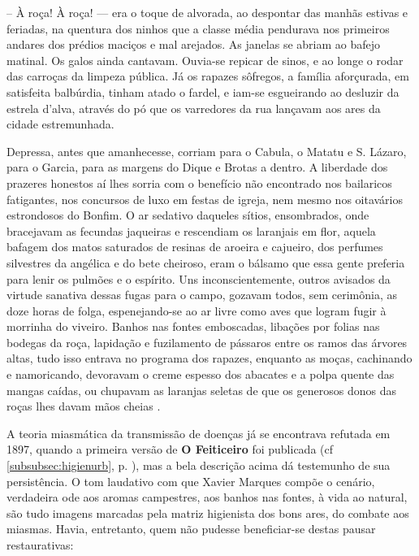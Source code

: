 \begin{citacao}
-- À roça! À roça! --- era o toque de alvorada, ao despontar das manhãs estivas e feriadas, na quentura dos ninhos que a classe média pendurava nos primeiros andares dos prédios maciços e mal arejados. As janelas se abriam ao bafejo matinal. Os galos ainda cantavam. Ouvia-se repicar de sinos, e ao longe o rodar das carroças da limpeza pública. Já os rapazes sôfregos, a família aforçurada, em satisfeita balbúrdia, tinham atado o fardel, e iam-se esgueirando ao desluzir da estrela d'alva, através do pó que os varredores da rua lançavam aos ares da cidade estremunhada.

Depressa, antes que amanhecesse, corriam para o Cabula, o Matatu e S. Lázaro, para o Garcia, para as margens do Dique e Brotas a dentro. A liberdade dos prazeres honestos aí lhes sorria com o benefício não encontrado nos bailaricos fatigantes, nos concursos de luxo em festas de igreja, nem mesmo nos oitavários estrondosos do Bonfim. O ar sedativo daqueles sítios, ensombrados, onde bracejavam as fecundas jaqueiras e rescendiam os laranjais em flor, aquela bafagem dos matos saturados de resinas de aroeira e cajueiro, dos perfumes silvestres da angélica e do bete cheiroso, eram o bálsamo que essa gente preferia para lenir os pulmões e o espírito. Uns inconscientemente, outros avisados da virtude sanativa dessas fugas para o campo, gozavam todos, sem cerimônia, as doze horas de folga, espenejando-se ao ar livre como aves que logram fugir à morrinha do viveiro. Banhos nas fontes emboscadas, libações por folias nas bodegas da roça, lapidação e fuzilamento de pássaros entre os ramos das árvores altas, tudo isso entrava no programa dos rapazes, enquanto as moças, cachinando e namoricando, devoravam o creme espesso dos abacates e a polpa quente das mangas caídas, ou chupavam as laranjas seletas de que os generosos donos das roças lhes davam mãos cheias \cite[pp.~3-4]{marques_feiticeiro_1975}.
\end{citacao}

A teoria miasmática da transmissão de doenças já se encontrava refutada em 1897, quando a primeira versão de \textbf{O Feiticeiro} foi publicada (cf \autoref{subsubsec:higienurb}, p. \pageref{subsubsec:higienurb}), mas a bela descrição acima dá testemunho de sua persistência. O tom laudativo com que Xavier Marques compõe o cenário, verdadeira ode aos aromas campestres, aos banhos nas fontes, à vida ao natural, são tudo imagens marcadas pela matriz higienista dos bons ares, do combate aos miasmas. Havia, entretanto, quem não pudesse beneficiar-se destas pausar restaurativas:

